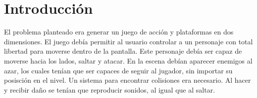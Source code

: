 \documentclass[letterpaper,11pt]{article} %
\begin{document}









\section{Introducción}
	El problema planteado era generar un juego de acción y plataformas en dos dimensiones. El juego debía permitir al usuario controlar a un personaje con total libertad para moverse dentro de la pantalla. Este personaje debía ser capaz de moverse hacia los lados, saltar y atacar. En la escena debían aparecer enemigos al azar, los cuales tenían que ser capaces de seguir al jugador, sin importar su posisción en el nivel. Un sistema para encontrar colisiones era necesario. Al hacer y recibir daño se tenían que reproducir sonidos, al igual que al saltar.

\end{document}
